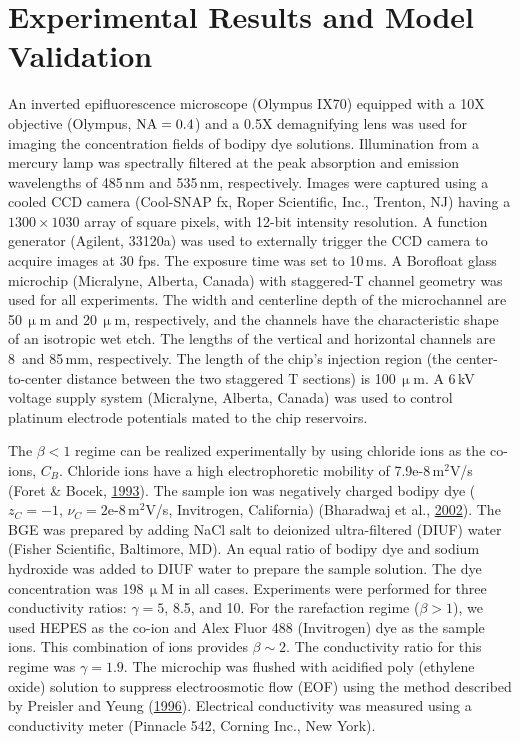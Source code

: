 \documentclass[lineno,authoryear]{FLO_v1}%
\theoremstyle{definition}
\begin{document}
\section{Experimental Results and Model Validation}

An inverted epifluorescence microscope (Olympus IX70)
equipped with a 10X objective (Olympus, ${\rm NA}=0.4$) and
a 0.5X demagnifying lens was used for imaging the
concentration fields of bodipy dye solutions. Illumination
from a mercury lamp was spectrally filtered at the peak
absorption and emission wavelengths of 485\,nm and 535\,nm,
respectively. Images were captured using a cooled CCD
camera (Cool-SNAP fx, Roper Scientific, Inc., Trenton, NJ)
having a $1300\times 1030$ array of square pixels, with
12-bit intensity resolution. A function generator (Agilent,
33120a) was used to externally trigger the CCD camera to
acquire images at 30 fps. The exposure time was set to
10\,ms. A Borofloat glass microchip (Micralyne, Alberta,
Canada) with staggered-T channel geometry was used for all
experiments. The width and centerline depth of the
microchannel are 50\,$\upmu$m and 20\,$\upmu$m, respectively,
and the channels have the characteristic shape of an
isotropic wet etch. The lengths of the vertical and
horizontal channels are 8~and 85\,mm, respectively. The
length of the chip's injection region (the center-to-center
distance between the two staggered T sections) is
100\,$\upmu$m. A 6\,kV voltage supply system (Micralyne,
Alberta, Canada) was used to control platinum electrode
potentials mated to the chip reservoirs.

The $\beta<1$ regime can be realized experimentally by
using chloride ions as the co-ions, $C_{B}$. Chloride ions
have a high electrophoretic mobility of 7.9e-8\,m$^{2}$V/s
(Foret \& Bocek, \hyperlink{bib8}{1993}). The sample ion
was negatively charged bodipy dye ($z_{C}=-1$,
$\nu_{C}=2$e-8\,m$^{2}$V/s, Invitrogen, California)
(Bharadwaj et al., \hyperlink{bib1}{2002}). The BGE was
prepared by adding NaCl salt to deionized ultra-filtered
(DIUF) water (Fisher Scientific, Baltimore, MD). An equal
ratio of bodipy dye and sodium hydroxide was added to DIUF
water to prepare the sample solution. The dye concentration
was 198\,$\upmu$M in all cases. Experiments were performed
for three conductivity ratios: $\gamma = 5$, 8.5, and 10.
For the rarefaction regime ($\beta >1$), we used HEPES as
the co-ion and Alex Fluor 488 (Invitrogen) dye as the
sample ions. This combination of ions provides $\beta \sim
2$. The conductivity ratio for this regime was
$\gamma=1.9$. The microchip was flushed with acidified poly
(ethylene oxide) solution to suppress electroosmotic flow
(EOF) using the method described by Preisler and Yeung
(\hyperlink{bib20}{1996}). Electrical conductivity was
measured using a conductivity meter (Pinnacle 542, Corning
Inc., New York).
\end{document}
